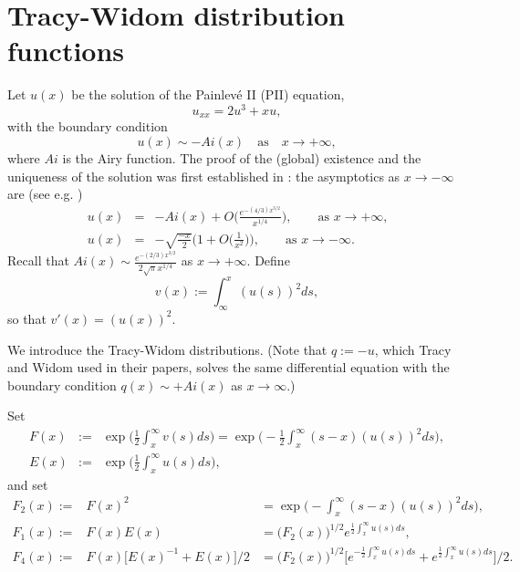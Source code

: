 \section{Tracy-Widom distribution functions}\label{sec-dist}


Let $u(x)$ be the solution of the Painlev\'e II (PII) equation,
\begin{equation}\label{as10}
  u_{xx}=2u^3+xu,
\end{equation}
with the boundary condition
\begin{equation}\label{as11}
  u(x)\sim -Ai(x)\quad\text{as}\quad x\to +\infty,
\end{equation}
where $Ai$ is the Airy function.
The proof of the (global) existence and the uniqueness of the solution 
was first established in \cite{HM} : 
the asymptotics as $x\to -\infty$ are 
(see e.g. \cite{HM,DZ2}) 
\begin{eqnarray}
\label{as17}  u(x) &=&
-Ai(x) + O\biggl( \frac{e^{-(4/3)x^{3/2}}}{x^{1/4}}\biggr),
\qquad\text{as $x\to +\infty$,}\\
\label{as18}  u(x) &=&
-\sqrt{\frac{-x}{2}}\biggl( 1+O\bigl(\frac1{x^2}\bigr)\biggr),
\qquad\text{as $x\to -\infty$.}
\end{eqnarray}
Recall that $Ai(x)\sim \frac{e^{-(2/3)x^{3/2}}}{2\sqrt{\pi}x^{1/4}}$
as $x\to +\infty$.
Define
\begin{equation}\label{as12}
  v(x):= \int_{\infty}^{x} (u(s))^2 ds,
\end{equation}
so that $v'(x)= (u(x))^2$.


We introduce the Tracy-Widom distributions.
(Note that $q:=-u$, which Tracy and Widom used in their papers,
solves the same
differential equation with the boundary condition
$q(x)\sim +Ai(x)$ as $x\to\infty$.)

\begin{defn}\label{def1}
Set
\begin{eqnarray}
\label{as46-1}   F(x) &:=& \exp\biggl(\frac12\int_x^{\infty} v(s)ds\biggr)
= \exp\biggl(-\frac12\int_x^{\infty} (s-x)(u(s))^2ds\biggr),\\
\label{as47-1}   E(x) &:=& \exp\biggl(\frac12\int_x^{\infty} u(s)ds\biggr),
\end{eqnarray}
and set
\begin{eqnarray}
   F_2(x) :=& F(x)^2 &=\exp\biggl(-\int_x^{\infty} (s-x)(u(s))^2ds\biggr),\\
   F_1(x) :=& F(x)E(x) &= \bigl(F_2(x)\bigr)^{1/2}
e^{\frac12\int_x^{\infty} u(s)ds} ,\\
   F_4(x) :=& F(x)\bigl[E(x)^{-1}+E(x)\bigr]/2
&= \bigl(F_2(x)\bigr)^{1/2}
\biggl[ e^{-\frac12\int_x^{\infty} u(s)ds} +
e^{\frac12\int_x^{\infty} u(s)ds} \biggr] /2 .
\end{eqnarray}
\end{defn}

